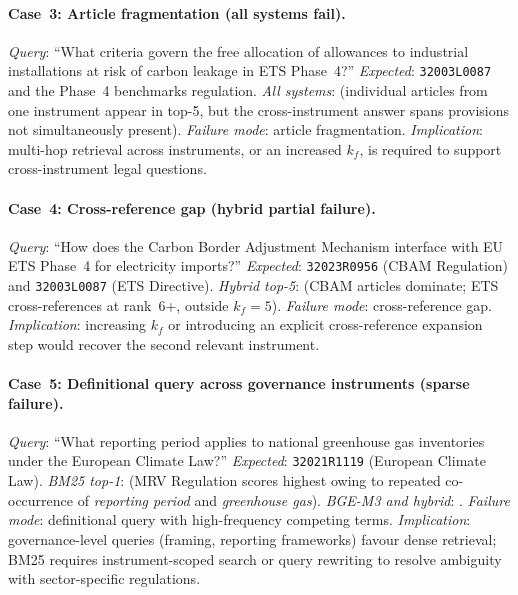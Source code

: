 \documentclass{iosart2x}
\newcommand{\PH}{\text{[PLACEHOLDER]}\xspace}
\newcommand{\bgem}{BGE-M3\xspace}
\begin{document}
\paragraph{Case~3: Article fragmentation (all systems fail).}
\textit{Query}: ``What criteria govern the free allocation of allowances
to industrial installations at risk of carbon leakage in ETS Phase~4?''
\textit{Expected}: \texttt{32003L0087} and the Phase~4 benchmarks
regulation.
\textit{All systems}: \PH{} (individual articles from one instrument
appear in top-5, but the cross-instrument answer spans provisions
not simultaneously present).
\textit{Failure mode}: article fragmentation.
\textit{Implication}: multi-hop retrieval across instruments, or an
increased $k_f$, is required to support cross-instrument legal
questions.

\paragraph{Case~4: Cross-reference gap (hybrid partial failure).}
\textit{Query}: ``How does the Carbon Border Adjustment Mechanism
interface with EU ETS Phase~4 for electricity imports?''
\textit{Expected}: \texttt{32023R0956} (CBAM Regulation) and
\texttt{32003L0087} (ETS Directive).
\textit{Hybrid top-5}: \PH{} (CBAM articles dominate; ETS
cross-references at rank~6+, outside $k_f{=}5$).
\textit{Failure mode}: cross-reference gap.
\textit{Implication}: increasing $k_f$ or introducing an explicit
cross-reference expansion step would recover the second relevant
instrument.

\paragraph{Case~5: Definitional query across governance instruments (sparse failure).}
\textit{Query}: ``What reporting period applies to national greenhouse gas
inventories under the European Climate Law?''
\textit{Expected}: \texttt{32021R1119} (European Climate Law).
\textit{BM25 top-1}: \PH{} (MRV Regulation scores highest owing to
repeated co-occurrence of \textit{reporting period} and
\textit{greenhouse gas}).
\textit{\bgem{} and hybrid}: \PH.
\textit{Failure mode}: definitional query with high-frequency competing terms.
\textit{Implication}: governance-level queries (framing, reporting
frameworks) favour dense retrieval; BM25 requires instrument-scoped
search or query rewriting to resolve ambiguity with sector-specific
regulations.

\end{document}
